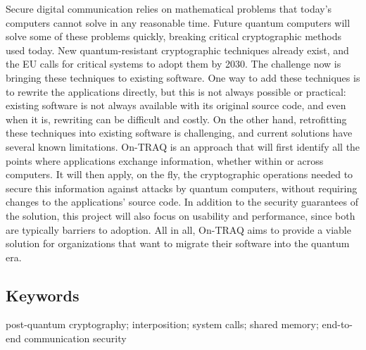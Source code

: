 \documentclass[a4paper,10pt,fleqn]{application}
\begin{document}
Secure digital communication relies on mathematical problems that today's computers cannot solve in any reasonable time. Future quantum computers will solve some of these problems quickly, breaking critical cryptographic methods used today. New quantum-resistant cryptographic techniques already exist, and the EU calls for critical systems to adopt them by 2030. The challenge now is bringing these techniques to existing software. One way to add these techniques is to rewrite the applications directly, but this is not always possible or practical: existing software is not always available with its original source code, and even when it is, rewriting can be difficult and costly. On the other hand, retrofitting these techniques into existing software is challenging, and current solutions have several known limitations. On-TRAQ is an approach that will first identify all the points where applications exchange information, whether within or across computers. It will then apply, on the fly, the cryptographic operations needed to secure this information against attacks by quantum computers, without requiring changes to the applications' source code. In addition to the security guarantees of the solution, this project will also focus on usability and performance, since both are typically barriers to adoption. All in all, On-TRAQ aims to provide a viable solution for organizations that want to migrate their software into the quantum era. 



\subsection{Keywords}

post-quantum cryptography; interposition; system calls; shared memory; end-to-end communication security

\newpage
\end{document}
